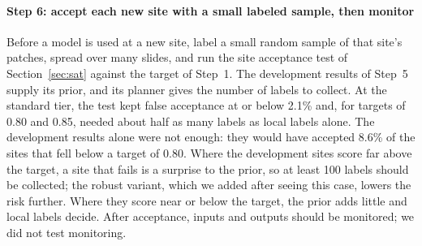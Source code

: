 \paragraph{Step 6: accept each new site with a small labeled sample, then
monitor} Before a model is used at a new site, label a small random sample of
that site's patches, spread over many slides, and run the site acceptance test
of Section~\ref{sec:sat} against the target of Step~1. The development results
of Step~5 supply its prior, and its planner gives the number of labels to
collect. At the standard tier, the test kept false acceptance at or below 2.1\%
and, for targets of 0.80 and 0.85, needed about half as many labels as local
labels alone. The development
results alone were not enough: they would have accepted 8.6\% of the sites
that fell below a target of 0.80. Where the development sites score far above the
target, a site that fails is a surprise to the prior, so at least 100 labels
should be collected; the robust variant, which we added after seeing this
case, lowers the risk further. Where they score near or below the target, the
prior adds little and local labels decide. After acceptance, inputs and outputs
should be monitored; we did not test monitoring.

